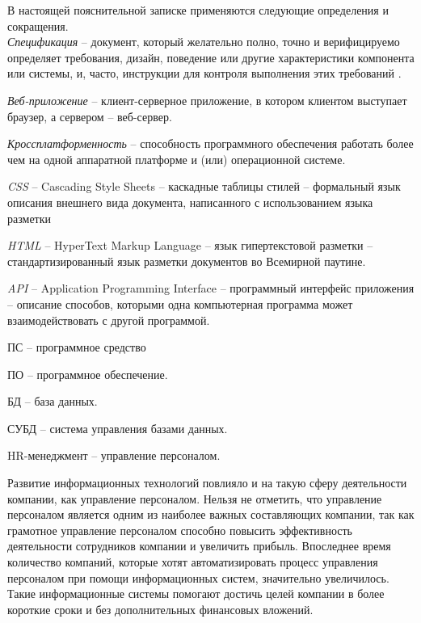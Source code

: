 \label{sec:definitions}

В настоящей пояснительной записке применяются следующие определения и сокращения.
\\

\emph{Спецификация} -- документ, который желательно полно, точно и верифицируемо определяет требования, дизайн,
поведение или другие характеристики компонента или системы, и, часто, инструкции для контроля выполнения этих
требований \cite{istqb_specification}.

\emph{Веб-приложение} -- клиент-серверное приложение, в котором клиентом выступает браузер, а сервером – веб-сервер.

\emph{Кроссплатформенность} -- способность программного обеспечения работать более чем на одной аппаратной платформе и (или) операционной системе.

\emph{CSS} -- Cascading Style Sheets -- каскадные таблицы стилей -- формальный язык описания внешнего вида документа,
написанного с использованием языка разметки

\emph{HTML} -- HyperText Markup Language -- язык гипертекстовой разметки -- стандартизированный язык разметки документов
во Всемирной паутине.

\emph{API} -- Application Programming Interface -- программный интерфейс приложения -- описание способов, которыми одна компьютерная программа может
взаимодействовать с другой программой. 

ПС -- программное средство

ПО -- программное обеспечение.

БД -- база данных.

СУБД -- система управления базами данных.

HR-менеджмент -- управление персоналом.
\\

\label{sec:introduction}
 
Развитие информационных технологий повлияло и на такую сферу деятельности компании, как управление персоналом.
Нельзя не отметить, что управление персоналом является одним из наиболее важных составляющих компании, так как
грамотное управление персоналом способно повысить эффективность деятельности сотрудников компании и увеличить
прибыль. Впоследнее время количество компаний, которые хотят автоматизировать процесс управления персоналом при помощи
информационных систем, значительно увеличилось. Такие информационные системы помогают достичь целей компании в более
короткие сроки и без дополнительных финансовых вложений.

